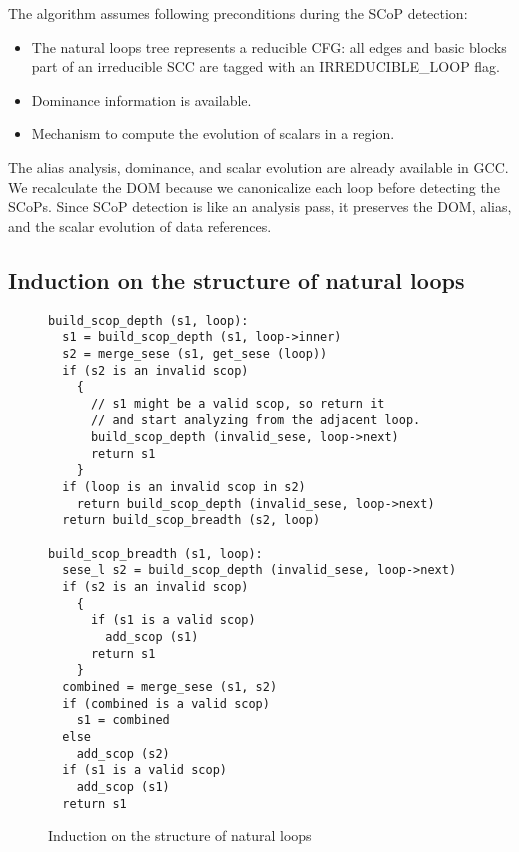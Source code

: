 \documentclass{sigplanconf}
\begin{document}
The algorithm assumes following preconditions during the SCoP detection:
\begin{itemize}
\item The natural loops tree represents a reducible CFG: all edges and basic
  blocks part of an irreducible SCC are tagged with an IRREDUCIBLE\_LOOP flag.

\item Dominance information is available.
\item Mechanism to compute the evolution of scalars in a region.
\end{itemize}

The alias analysis, dominance, and scalar evolution are already available in
GCC.  We recalculate the DOM because we canonicalize each loop before detecting
the SCoPs.  Since SCoP detection is like an analysis pass, it preserves the DOM,
alias, and the scalar evolution of data references.

\subsection{Induction on the structure of natural loops}
\label{subsec:induction}

\begin{figure}
\begin{verbatim}
build_scop_depth (s1, loop):
  s1 = build_scop_depth (s1, loop->inner)
  s2 = merge_sese (s1, get_sese (loop))
  if (s2 is an invalid scop)
    {
      // s1 might be a valid scop, so return it
      // and start analyzing from the adjacent loop.
      build_scop_depth (invalid_sese, loop->next)
      return s1
    }
  if (loop is an invalid scop in s2)
    return build_scop_depth (invalid_sese, loop->next)
  return build_scop_breadth (s2, loop)

build_scop_breadth (s1, loop):
  sese_l s2 = build_scop_depth (invalid_sese, loop->next)
  if (s2 is an invalid scop)
    {
      if (s1 is a valid scop)
        add_scop (s1)
      return s1
    }
  combined = merge_sese (s1, s2)
  if (combined is a valid scop)
    s1 = combined
  else
    add_scop (s2)
  if (s1 is a valid scop)
    add_scop (s1)
  return s1
\end{verbatim}
\caption{Induction on the structure of natural loops}
\label{fig:induction}
\end{figure}
\end{document}
